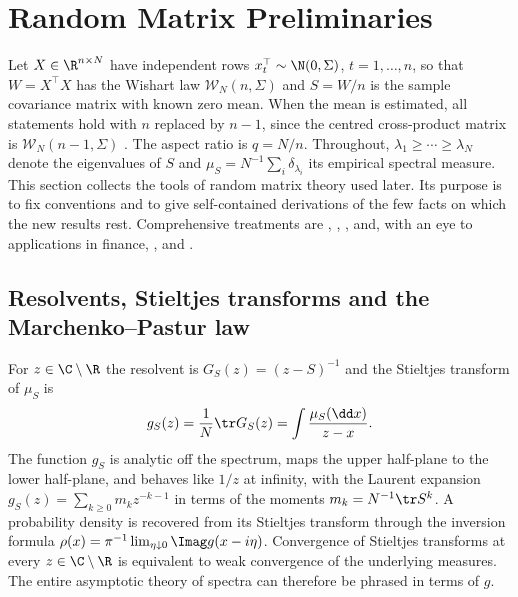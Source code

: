 \section*{Random Matrix Preliminaries}

Let $X\in\R^{n\times N}$ have independent rows $x_t^\top\sim\N(0,\Sigma)$, $t=1,\ldots,n$, so that $W=X^\top X$ has the Wishart law $\mathcal W_N(n,\Sigma)$ and $S=W/n$ is the sample covariance matrix with known zero mean. When the mean is estimated, all statements hold with $n$ replaced by $n-1$, since the centred cross-product matrix is $\mathcal W_N(n-1,\Sigma)$ \citep[Ch.~3]{muirhead1982aspects}. The aspect ratio is $q=N/n$. Throughout, $\lambda_1\geq\cdots\geq\lambda_N$ denote the eigenvalues of $S$ and $\mu_S=N^{-1}\sum_i\delta_{\lambda_i}$ its empirical spectral measure. This section collects the tools of random matrix theory used later. Its purpose is to fix conventions and to give self-contained derivations of the few facts on which the new results rest. Comprehensive treatments are \citet{bai2010spectral}, \citet{anderson2010introduction}, \citet{tao2012topics}, \citet{erdos2017dynamical} and, with an eye to applications in finance, \citet{bouchaud2011financial}, \citet{bun2017cleaning} and \citet{potters2020first}.

\subsection*{Resolvents, Stieltjes transforms and the Marchenko--Pastur law}

For $z\in\C\setminus\R$ the resolvent is $G_S(z)=(z-S)^{-1}$ and the Stieltjes transform of $\mu_S$ is
\[
 g_S(z)=\frac1N\tr G_S(z)=\int\frac{\mu_S(\dd x)}{z-x}.
\]
The function $g_S$ is analytic off the spectrum, maps the upper half-plane to the lower half-plane, and behaves like $1/z$ at infinity, with the Laurent expansion $g_S(z)=\sum_{k\geq0}m_k z^{-k-1}$ in terms of the moments $m_k=N^{-1}\tr S^k$. A probability density is recovered from its Stieltjes transform through the inversion formula $\rho(x)=\pi^{-1}\lim_{\eta\downarrow0}\Imag g(x-i\eta)$. Convergence of Stieltjes transforms at every $z\in\C\setminus\R$ is equivalent to weak convergence of the underlying measures. The entire asymptotic theory of spectra can therefore be phrased in terms of $g$.

